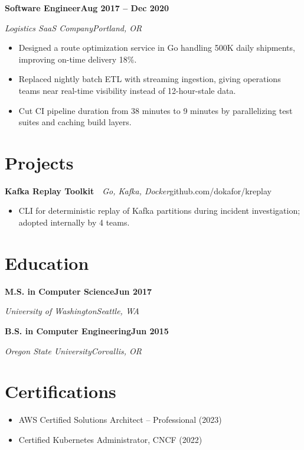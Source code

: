 \documentclass[letterpaper,10pt]{article}
\newcommand{\rRole}[4]{%
  \vspace{3pt}%
  \noindent\textbf{#1}\hfill\textbf{#4}\par
  \noindent\textit{\color{muted}#2}\hfill\textit{\color{muted}#3}\par
  \vspace{1pt}%
}
\newcommand{\rProject}[3]{%
  \vspace{3pt}%
  \noindent\textbf{#1}\ \textbar\ \textit{\color{muted}#2}\hfill#3\par
  \vspace{1pt}%
}
\newcommand{\rEdu}[4]{%
  \vspace{3pt}%
  \noindent\textbf{#1}\hfill\textbf{#4}\par
  \noindent\textit{\color{muted}#2}\hfill\textit{\color{muted}#3}\par
  \vspace{1pt}%
}
\newenvironment{rBullets}
  {\begin{itemize}[leftmargin=13pt,itemsep=2pt,parsep=0pt,topsep=2pt,
                   partopsep=0pt,label=\textbullet]}
  {\end{itemize}}
\begin{document}
\rRole{Software Engineer}{Logistics SaaS Company}{Portland, OR}{Aug 2017 -- Dec 2020}
\begin{rBullets}
  \item Designed a route optimization service in Go handling 500K daily shipments, improving on-time delivery 18\%.
  \item Replaced nightly batch ETL with streaming ingestion, giving operations teams near real-time visibility instead of 12-hour-stale data.
  \item Cut CI pipeline duration from 38 minutes to 9 minutes by parallelizing test suites and caching build layers.
\end{rBullets}

\section{Projects}

\rProject{Kafka Replay Toolkit}{Go, Kafka, Docker}{github.com/dokafor/kreplay}
\begin{rBullets}
  \item CLI for deterministic replay of Kafka partitions during incident investigation; adopted internally by 4 teams.
\end{rBullets}

\section{Education}
\rEdu{M.S. in Computer Science}{University of Washington}{Seattle, WA}{Jun 2017}
\rEdu{B.S. in Computer Engineering}{Oregon State University}{Corvallis, OR}{Jun 2015}

\section{Certifications}
\begin{rBullets}
  \item AWS Certified Solutions Architect -- Professional (2023)
  \item Certified Kubernetes Administrator, CNCF (2022)
\end{rBullets}
\end{document}
